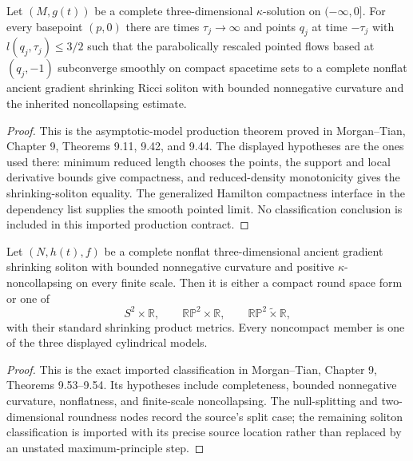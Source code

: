 \begin{theorem}
\label{thm:asymptotic-gradient-shrinking-soliton}
\notready
Let $(M,g(t))$ be a complete three-dimensional $\kappa$-solution on
$(-\infty,0]$.  For every basepoint $(p,0)$ there are times
$\tau_j\to\infty$ and points $q_j$ at time $-\tau_j$ with
$l(q_j,\tau_j)\le3/2$ such that the parabolically rescaled pointed flows
based at $(q_j,-1)$ subconverge smoothly on compact spacetime sets to a
complete nonflat ancient gradient shrinking Ricci soliton with bounded
nonnegative curvature and the inherited noncollapsing estimate.
\end{theorem}
\begin{proof}
This is the asymptotic-model production theorem proved in Morgan--Tian,
Chapter 9, Theorems 9.11, 9.42, and 9.44.  The displayed hypotheses are the
ones used there: minimum reduced length chooses the points, the support and
local derivative bounds give compactness, and reduced-density monotonicity
gives the shrinking-soliton equality.  The generalized Hamilton compactness
interface in the dependency list supplies the smooth pointed limit.  No
classification conclusion is included in this imported production contract.
\end{proof}

\begin{theorem}
\label{thm:three-dimensional-gradient-shrinker-classification}
\notready
Let $(N,h(t),f)$ be a complete nonflat three-dimensional ancient gradient
shrinking soliton with bounded nonnegative curvature and positive
$\kappa$-noncollapsing on every finite scale.  Then it is either a compact
round space form or one of
\[
 S^2\times\mathbb R,\qquad
 \mathbb{RP}^2\times\mathbb R,\qquad
 \mathbb{RP}^2\widetilde\times\mathbb R,
\]
with their standard shrinking product metrics.  Every noncompact member is
one of the three displayed cylindrical models.
\end{theorem}
\begin{proof}
This is the exact imported classification in Morgan--Tian, Chapter 9,
Theorems 9.53--9.54.  Its hypotheses include completeness, bounded
nonnegative curvature, nonflatness, and finite-scale noncollapsing.  The
null-splitting and two-dimensional roundness nodes record the source's split
case; the remaining soliton classification is imported with its precise
source location rather than replaced by an unstated maximum-principle step.
\end{proof}


